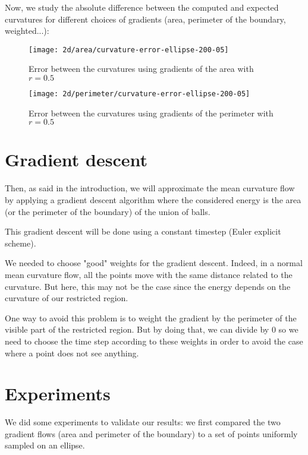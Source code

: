 
Now, we study the absolute difference between the computed and expected
curvatures for different choices of gradients (area, perimeter of the boundary,
weighted...):

\begin{figure}[H]
    \centering

    \texttt{[image: 2d/area/curvature-error-ellipse-200-05]}
    \caption{Error between the curvatures using gradients of the area with $ r = 0.5 $}

    \texttt{[image: 2d/perimeter/curvature-error-ellipse-200-05]}
    \caption{Error between the curvatures using gradients of the perimeter with $ r = 0.5 $}
\end{figure}

\section{Gradient descent}

Then, as said in the introduction, we will approximate the mean curvature flow
by applying a gradient descent algorithm where the considered energy is the area
(or the perimeter of the boundary) of the union of balls.

This gradient descent will be done using a constant timestep (Euler explicit
scheme).

We needed to choose "good" weights for the gradient descent. Indeed, in a normal
mean curvature flow, all the points move with the same distance related to the
curvature. But here, this may not be the case since the energy depends on the
curvature of our restricted region.

One way to avoid this problem is to weight the gradient by the perimeter of the
visible part of the restricted region. But by doing that, we can divide by $ 0 $
so we need to choose the time step according to these weights in order to avoid
the case where a point does not see anything.


\section{Experiments}

We did some experiments to validate our results: we first compared the two
gradient flows (area and perimeter of the boundary) to a set of points uniformly
sampled on an ellipse.

